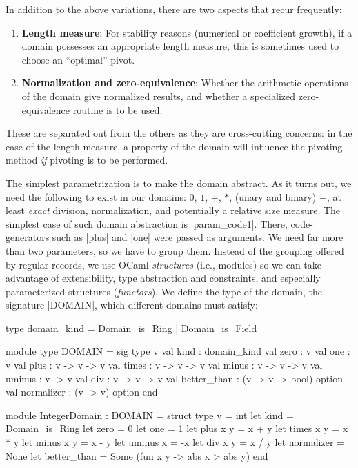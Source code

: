 \documentclass[draft]{elsart}
\begin{document}
\noindent In addition to the above variations, there are two aspects that 
recur frequently:
\vspace*{-6pt}
\begin{enumerate}
    \item \textbf{Length measure}:  For stability reasons
        (numerical or coefficient growth), if a domain
      possesses
        an appropriate length measure, this is sometimes used to choose
        an ``optimal'' pivot.
    \item \textbf{Normalization and zero-equivalence}: Whether the
      arithmetic operations of the domain give normalized results, and
      whether a specialized zero-equivalence routine is to be used.
\end{enumerate}
\noindent These are separated out from the others as they are cross-cutting
concerns: in the case of the length measure, a property of the domain
will influence the pivoting method \emph{if} pivoting is to be
performed.

The simplest parametrization is to make the domain abstract. As it
turns out, we need the following to exist in our domains: $0$, $1$,
$+$, $*$, (unary and binary) $-$, at least \emph{exact} division,
normalization, and potentially a relative size measure. The simplest
case of such domain abstraction is |param_code1|.
There, code-generators such as |plus| and |one|
were passed as arguments. We need far more than
two parameters, so we have to group them. Instead of the grouping
offered by regular records, we use OCaml \emph{structures} (i.e.,
modules)
so we can take advantage of extensibility, type abstraction and constraints,
and especially parameterized structures (\emph{functors}).
We define the type of the domain, the signature |DOMAIN|, which
different domains must satisfy:

\begin{code}
type domain_kind = Domain_is_Ring | Domain_is_Field

module type DOMAIN = sig
  type v
  val kind : domain_kind
  val zero : v
  val one : v
  val plus : v -> v -> v
  val times : v -> v -> v
  val minus : v -> v -> v
  val uminus : v -> v
  val div : v -> v -> v
  val better_than : (v -> v -> bool) option
  val normalizer : (v -> v) option
end 

module IntegerDomain : DOMAIN = struct
    type v = int
    let kind = Domain_is_Ring
    let zero = 0
    let one = 1
    let plus x y = x + y
    let times x y = x * y
    let minus x y = x - y
    let uminus x = -x
    let div x y = x / y
    let normalizer = None
    let better_than = Some (fun x y -> abs x > abs y)
end
\end{code}
\end{document}
